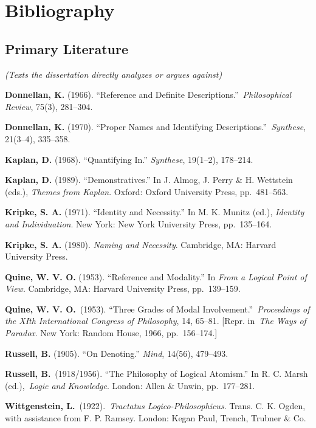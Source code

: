 \documentclass[12pt,a4paper]{article}
\begin{document}
\section{Bibliography}\label{bibliography}

\subsection{Primary Literature}\label{primary-literature}

\emph{(Texts the dissertation directly analyzes or argues against)}

\textbf{Donnellan, K.} (1966). ``Reference and Definite Descriptions.''~\emph{Philosophical Review}, 75(3), 281--304.

\textbf{Donnellan, K.} (1970). ``Proper Names and Identifying Descriptions.''~\emph{Synthese}, 21(3--4), 335--358.

\textbf{Kaplan, D.} (1968). ``Quantifying In.'' \emph{Synthese}, 19(1--2), 178--214.

\textbf{Kaplan, D.} (1989). ``Demonstratives.'' In J. Almog, J. Perry \& H. Wettstein (eds.), \emph{Themes from Kaplan}. Oxford: Oxford University Press, pp.~481--563.

\textbf{Kripke, S. A.} (1971). ``Identity and Necessity.'' In M. K. Munitz (ed.), \emph{Identity and Individuation}. New York: New York University Press, pp.~135--164.

\textbf{Kripke, S. A.} (1980). \emph{Naming and Necessity}. Cambridge, MA: Harvard University Press.

\textbf{Quine, W. V. O.} (1953). ``Reference and Modality.'' In \emph{From a Logical Point of View}. Cambridge, MA: Harvard University Press, pp.~139--159.

\textbf{Quine, W. V. O.}~(1953). ``Three Grades of Modal Involvement.''~\emph{Proceedings of the XIth International Congress of Philosophy}, 14, 65--81. {[}Repr. in~\emph{The Ways of Paradox}. New York: Random House, 1966, pp.~156--174.{]}

\textbf{Russell, B.} (1905). ``On Denoting.'' \emph{Mind}, 14(56), 479--493.

\textbf{Russell, B.}~(1918/1956). ``The Philosophy of Logical Atomism.'' In R. C. Marsh (ed.),~\emph{Logic and Knowledge}. London: Allen \& Unwin, pp.~177--281.

\textbf{Wittgenstein, L.}~(1922).~\emph{Tractatus Logico-Philosophicus}. Trans. C. K. Ogden, with assistance from F. P. Ramsey. London: Kegan Paul, Trench, Trubner \& Co.
\end{document}
